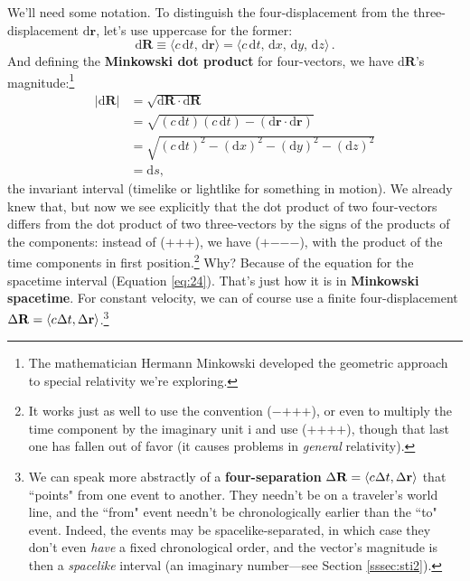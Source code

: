 \documentclass[12pt]{article}
\renewcommand{\vv}[1]{\mathbf{#1}}
\newcommand{\dd}[1]{\mathrm{d}#1}
\begin{document}
We'll need some notation. To distinguish the four-displacement from the three-displacement $\dd \vv r$, let's use uppercase for the former:
\begin{equation}\label{eq:30}
\boxed{\dd \vv R \equiv \langle c \, \dd t, \, \dd \vv r \rangle = \langle c\, \dd t, \, \dd x, \, \dd y, \, \dd z \rangle} \, .
\end{equation}
And defining the \textbf{Minkowski dot product} for four-vectors, we have $\dd \vv R$'s magnitude:\footnote{The mathematician Hermann Minkowski developed the geometric approach to special relativity we're exploring.}
\begin{equation*}
\begin{split}
\vert \dd \vv R \vert &= \sqrt{\dd \vv R \cdot \dd \vv R}\\
&= \sqrt{(c \, \dd t)(c \, \dd t) - (\dd \vv r \cdot \dd \vv r)}\\
&= \sqrt{(c \, \dd t)^2 - (\dd x)^2 - (\dd y)^2 - (\dd z)^2}\\
&= \dd s,
\end{split}
\end{equation*}
the invariant interval (timelike or lightlike for something in motion). We already knew that, but now we see explicitly that the dot product of two four-vectors differs from the dot product of two three-vectors by the signs of the products of the components: instead of ($+$$+$$+$), we have ($+$$-$$-$$-$), with the product of the time components in first position.\footnote{\label{fn:sc}It works just as well to use the convention ($-$$+$$+$$+$), or even to multiply the time component by the imaginary unit $\mathrm{i}$ and use ($+$$+$$+$$+$), though that last one has fallen out of favor (it causes problems in \emph{general} relativity).} Why? Because of the equation for the spacetime interval (Equation \ref{eq:24}). That's just how it is in \textbf{Minkowski spacetime}. For constant velocity, we can of course use a finite four-displacement $\Delta \vv R = \langle c \mkern.5mu \Delta t, \Delta \vv r \rangle$.\footnote{\label{fn:sp}We can speak more abstractly of a \textbf{four-separation} $\Delta \vv R = \langle c \mkern.5mu \Delta t, \Delta \vv r \rangle$ that ``points" from one event to another. They needn't be on a traveler's world line, and the ``from" event needn't be chronologically earlier than the ``to" event. Indeed, the events may be spacelike-separated, in which case they don't even \emph{have} a fixed chronological order, and the vector's magnitude is then a \emph{spacelike} interval (an imaginary number---see Section \ref{sssec:sti2}).}
\end{document}
